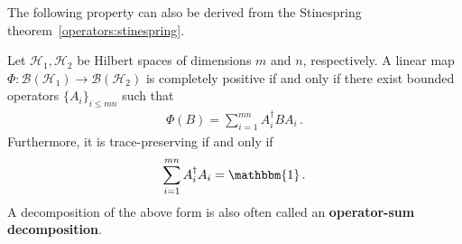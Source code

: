     The following property can also be derived from the Stinespring theorem~\ref{operators:stinespring}.
    \begin{property}\label{qc:kraus}
        Let $\mathcal{H}_1,\mathcal{H}_2$ be Hilbert spaces of dimensions $m$ and $n$, respectively. A linear map $\Phi:\mathcal{B}(\mathcal{H}_1)\rightarrow\mathcal{B}(\mathcal{H}_2)$ is completely positive if and only if there exist bounded operators $\{A_i\}_{i\leq mn}$ such that
        \begin{gather}
            \Phi(B) = \sum_{i=1}^{mn}A^\dag_iBA_i\,.
        \end{gather}
        Furthermore, it is trace-preserving if and only if
        \begin{gather}
            \sum_{i=1}^{mn}A^\dag_iA_i = \mathbbm{1}\,.
        \end{gather}
        A decomposition of the above form is also often called an \textbf{operator-sum decomposition}.
    \end{property}